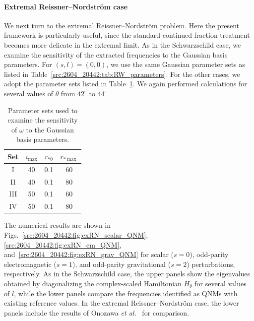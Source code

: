 \paragraph{Extremal Reissner--Nordstr\"om case}
We next turn to the extremal Reissner--Nordstr\"om problem.
Here the present framework is particularly useful, since the standard continued-fraction treatment becomes more delicate in the extremal limit.
As in the Schwarzschild case, we examine the sensitivity of the extracted frequencies to the Gaussian basis parameters.
For $(s,l)=(0,0)$, we use the same Gaussian parameter sets as listed in Table~\ref{src:2604_20442:tab:RW_parameters}. For the other cases, we adopt the parameter sets listed in Table~\ref{src:2604_20442:tab:exRN_parameters}.
We again performed calculations for several values of $\theta$ from $42^\circ$ to $44^\circ$
\begin{table}[htbp]
  \centering
  \caption{Parameter sets used to examine the sensitivity of $\omega$ to the Gaussian basis parameters.}
  \label{src:2604_20442:tab:exRN_parameters}
  \begin{tabular}{cccc}
    \toprule
    Set & $i_{\max}$ & $r_{*0}$ & $r_{*\max}$ \\
    \midrule
    I & 40 & 0.1 & 60 \\
    II & 40 & 0.1 & 80 \\
    III & 50 & 0.1 & 60 \\
    IV & 50 & 0.1 & 80 \\
    \bottomrule
  \end{tabular}
\end{table}
The numerical results are shown in Figs.~\ref{src:2604_20442:fig:exRN_scalar_QNM}, \ref{src:2604_20442:fig:exRN_em_QNM}, and~\ref{src:2604_20442:fig:exRN_grav_QNM} for scalar ($s=0$), odd-parity electromagnetic ($s=1$), and odd-parity gravitational ($s=2$) perturbations, respectively.
As in the Schwarzschild case, the upper panels show the eigenvalues obtained by diagonalizing the complex-scaled Hamiltonian $H_\theta$ for several values of $l$, while the lower panels compare the frequencies identified as QNMs with existing reference values.
In the extremal Reissner--Nordstr\"om case, the lower panels include the results of Onozawa \textit{et al.\/}~\cite{Onozawa:1995vu} for comparison.
